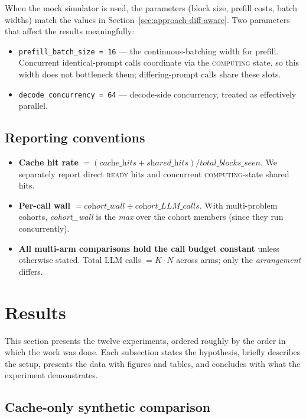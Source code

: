 \documentclass[11pt]{article}
\begin{document}
When the mock simulator is used, the parameters (block size, prefill
costs, batch widths) match the values in
Section~\ref{sec:approach-diff-aware}. Two parameters that affect the
results meaningfully:
\begin{itemize}
  \item \verb|prefill_batch_size = 16| --- the continuous-batching
    width for prefill. Concurrent identical-prompt calls coordinate
    via the \textsc{computing} state, so this width does not bottleneck
    them; differing-prompt calls share these slots.
  \item \verb|decode_concurrency = 64| --- decode-side concurrency,
    treated as effectively parallel.
\end{itemize}

\subsection{Reporting conventions}

\begin{itemize}
  \item \textbf{Cache hit rate} $= (\textit{cache\_hits} +
    \textit{shared\_hits}) / \textit{total\_blocks\_seen}$. We
    separately report direct \textsc{ready} hits and concurrent
    \textsc{computing}-state shared hits.
  \item \textbf{Per-call wall} $= \textit{cohort\_wall} \div
    \textit{cohort\_LLM\_calls}$. With multi-problem cohorts,
    \textit{cohort\_wall} is the \emph{max} over the cohort members
    (since they run concurrently).
  \item \textbf{All multi-arm comparisons hold the call budget
    constant} unless otherwise stated. Total LLM calls $= K \cdot N$
    across arms; only the \emph{arrangement} differs.
\end{itemize}

\section{Results}
\label{sec:results}

This section presents the twelve experiments, ordered roughly by the
order in which the work was done. Each subsection states the
hypothesis, briefly describes the setup, presents the data with
figures and tables, and concludes with what the experiment
demonstrates.

\subsection{Cache-only synthetic comparison}
\label{sec:results-cache-only}
\end{document}
